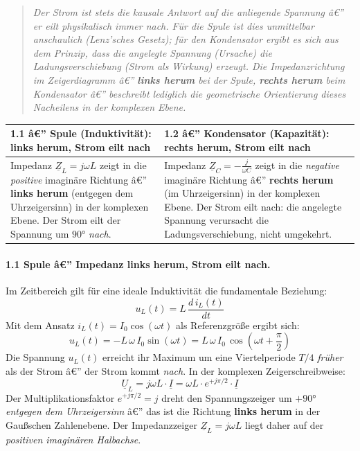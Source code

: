 ﻿\documentclass[12pt,a4paper,titlepage]{report}
\begin{document}
\begin{quote}
\itshape
Der Strom ist stets die kausale Antwort auf die anliegende Spannung â€”
er eilt physikalisch immer nach.
Für die Spule ist dies unmittelbar anschaulich (Lenz'sches Gesetz);
für den Kondensator ergibt es sich aus dem Prinzip, dass die angelegte Spannung
(Ursache) die Ladungsverschiebung (Strom als Wirkung) erzeugt.
Die Impedanzrichtung im Zeigerdiagramm â€” \textbf{links herum} bei der Spule,
\textbf{rechts herum} beim Kondensator â€” beschreibt lediglich die
\emph{geometrische Orientierung} dieses Nacheilens in der komplexen Ebene.
\end{quote}

\begin{center}
\renewcommand{\arraystretch}{1.4}
\begin{tabular}{p{7.5cm} p{7.5cm}}
\toprule
\textbf{1.1 â€” Spule (Induktivität): links herum, Strom eilt nach}
& \textbf{1.2 â€” Kondensator (Kapazität): rechts herum, Strom eilt nach} \\
\midrule
Impedanz $\underline{Z}_L = j\omega L$ zeigt in die \emph{positive} imaginäre
Richtung â€” \textbf{links herum} (entgegen dem Uhrzeigersinn) in der
komplexen Ebene. Der Strom eilt der Spannung um $90 °$ \emph{nach}.
& Impedanz $\underline{Z}_C = -\tfrac{j}{\omega C}$ zeigt in die
\emph{negative} imaginäre Richtung â€” \textbf{rechts herum} (im Uhrzeigersinn)
in der komplexen Ebene. Der Strom eilt nach:
die angelegte Spannung verursacht die Ladungsverschiebung, nicht umgekehrt. \\
\bottomrule
\end{tabular}
\end{center}

\paragraph{1.1 \quad Spule â€” Impedanz links herum, Strom eilt nach.}

Im Zeitbereich gilt für eine ideale Induktivität die fundamentale Beziehung:
\[
	u_L(t) = L\,\frac{d\,i_L(t)}{dt}
\]
Mit dem Ansatz $i_L(t) = I_0\cos(\omega t)$ als Referenzgröße ergibt sich:
\[
	u_L(t) = -L\,\omega\,I_0 \sin(\omega t) = L\,\omega\,I_0\,\cos\!\left(\omega t + \frac{\pi}{2}\right)
\]
Die Spannung $u_L(t)$ erreicht ihr Maximum um eine Viertelperiode $T/4$ \emph{früher}
als der Strom â€” der Strom kommt \emph{nach}. In der komplexen Zeigerschreibweise:
\[
	\underline{U}_L = j\omega L \cdot \underline{I} = \omega L \cdot e^{+j\pi/2} \cdot \underline{I}
\]
Der Multiplikationsfaktor $e^{+j\pi/2} = j$ dreht den Spannungszeiger um $+90 °$
\emph{entgegen dem Uhrzeigersinn} â€” das ist die Richtung \textbf{links herum} in der
Gaußschen Zahlenebene. Der Impedanzzeiger $\underline{Z}_L = j\omega L$ liegt daher auf der
\emph{positiven imaginären Halbachse}.
\end{document}

